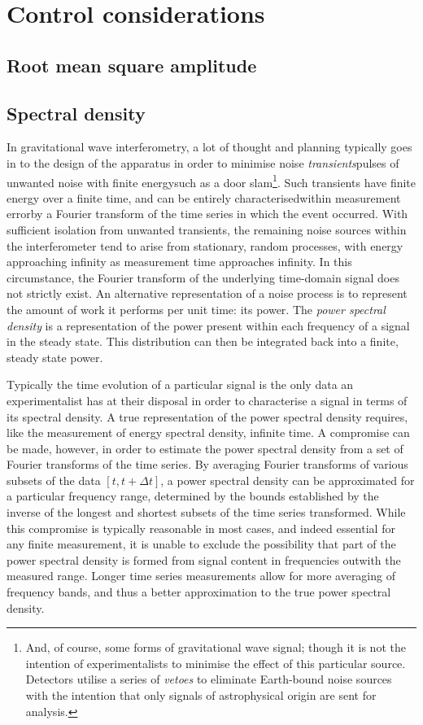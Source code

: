 \section{Control considerations}

\subsection{Root mean square amplitude}

\subsection{Spectral density}
In gravitational wave interferometry, a lot of thought and planning typically goes in to the design of the apparatus in order to minimise noise \emph{transients}\textemdash pulses of unwanted noise with finite energy\textemdash such as a door slam\footnote{And, of course, some forms of gravitational wave signal; though it is not the intention of experimentalists to minimise the effect of this particular source. Detectors utilise a series of \emph{vetoes} to eliminate Earth-bound noise sources with the intention that only signals of astrophysical origin are sent for analysis.}. Such transients have finite energy over a finite time, and can be entirely characterised\textemdash within measurement error\textemdash by a Fourier transform of the time series in which the event occurred. With sufficient isolation from unwanted transients, the remaining noise sources within the interferometer tend to arise from stationary, random processes, with energy approaching infinity as measurement time approaches infinity. In this circumstance, the Fourier transform of the underlying time-domain signal does not strictly exist. An alternative representation of a noise process is to represent the amount of work it performs per unit time: its power. The \emph{power spectral density} is a representation of the power present within each frequency of a signal in the steady state. This distribution can then be integrated back into a finite, steady state power.

Typically the time evolution of a particular signal is the only data an experimentalist has at their disposal in order to characterise a signal in terms of its spectral density. A true representation of the power spectral density requires, like the measurement of energy spectral density, infinite time. A compromise can be made, however, in order to estimate the power spectral density from a set of Fourier transforms of the time series. By averaging Fourier transforms of various subsets of the data $\left[ t, t + \Delta t \right]$, a power spectral density can be approximated for a particular frequency range, determined by the bounds established by the inverse of the longest and shortest subsets of the time series transformed. While this compromise is typically reasonable in most cases, and indeed essential for any finite measurement, it is unable to exclude the possibility that part of the power spectral density is formed from signal content in frequencies outwith the measured range. Longer time series measurements allow for more averaging of frequency bands, and thus a better approximation to the true power spectral density.

